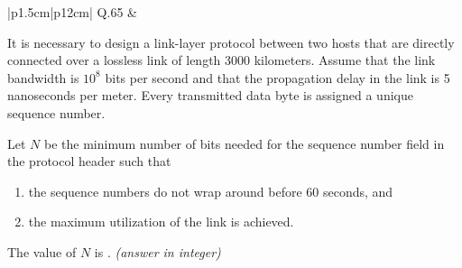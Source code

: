\documentclass[14pt]{article}
\begin{document}
\begin{tabular}{|p{1.5cm}|p{12cm}|}
\hline
Q.65 &
\parbox[t]{\linewidth}{
It is necessary to design a link-layer protocol between two hosts that are directly connected over a lossless link of length 3000 kilometers. Assume that the link bandwidth is $10^8$ bits per second and that the propagation delay in the link is 5 nanoseconds per meter. Every transmitted data byte is assigned a unique sequence number.

\vspace{0.3cm}

Let $N$ be the minimum number of bits needed for the sequence number field in the protocol header such that

\begin{enumerate}
\item the sequence numbers do not wrap around before 60 seconds, and
\item the maximum utilization of the link is achieved.
\end{enumerate}

The value of $N$ is \underline{\hspace{2cm}}. \textit{(answer in integer)}
}
\\
\hline
\end{tabular}
\end{document}
